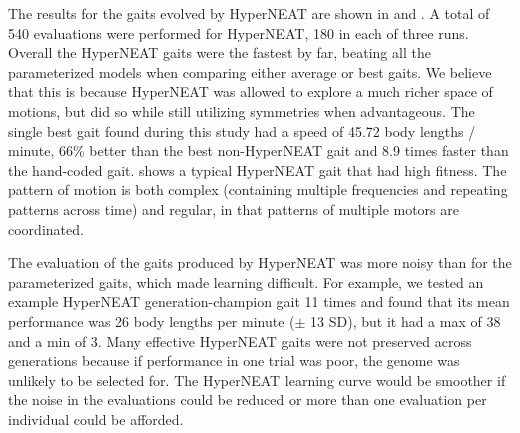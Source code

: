 The results for the gaits evolved by HyperNEAT are shown in
 and .  A total of 540 evaluations
were performed for HyperNEAT, 180 in each of three runs.
Overall the HyperNEAT gaits
were the fastest by far, beating all the parameterized models when
comparing either average or best gaits.  We believe that this is
because HyperNEAT was allowed to explore a much richer space of
motions, but did so while still utilizing symmetries when
advantageous.  The single best gait found during this study had a
speed of 45.72 body lengths / minute, 66\% better than the best
non-HyperNEAT gait and 8.9 times faster than the hand-coded gait.
 shows a typical
HyperNEAT gait that had high fitness.  The pattern of motion is both
complex (containing multiple frequencies and repeating patterns across
time) and regular, in that patterns of multiple motors are
coordinated.

The evaluation of the gaits produced by HyperNEAT was more noisy than
for the parameterized gaits, which made learning difficult. For
example, we tested an example HyperNEAT generation-champion gait 11
times and found that its mean performance was 26 body lengths per
minute ($\pm$ 13 SD), but it had a max of 38 and a min of 3.  Many
effective HyperNEAT gaits were not preserved across generations
because if performance in one trial was poor, the genome was unlikely
to be selected for. The HyperNEAT learning curve would be smoother if
the noise in the evaluations could be reduced or more than one
evaluation per individual could be afforded.



